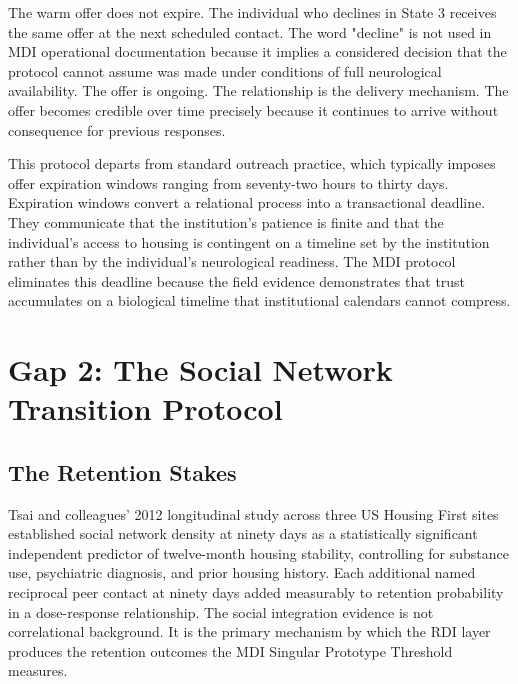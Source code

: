 \documentclass[12pt, letterpaper]{article}
\begin{document}
The warm offer does not expire. The individual who declines in State 3 receives the same offer at the next scheduled contact. The word "decline" is not used in MDI operational documentation because it implies a considered decision that the protocol cannot assume was made under conditions of full neurological availability. The offer is ongoing. The relationship is the delivery mechanism. The offer becomes credible over time precisely because it continues to arrive without consequence for previous responses.

This protocol departs from standard outreach practice, which typically imposes offer expiration windows ranging from seventy-two hours to thirty days. Expiration windows convert a relational process into a transactional deadline. They communicate that the institution's patience is finite and that the individual's access to housing is contingent on a timeline set by the institution rather than by the individual's neurological readiness. The MDI protocol eliminates this deadline because the field evidence demonstrates that trust accumulates on a biological timeline that institutional calendars cannot compress.


\clearpage
\section{Gap 2: The Social Network Transition Protocol}

\subsection{The Retention Stakes}

Tsai and colleagues' 2012 longitudinal study across three US Housing First sites established social network density at ninety days as a statistically significant independent predictor of twelve-month housing stability, controlling for substance use, psychiatric diagnosis, and prior housing history. Each additional named reciprocal peer contact at ninety days added measurably to retention probability in a dose-response relationship. The social integration evidence is not correlational background. It is the primary mechanism by which the RDI layer produces the retention outcomes the MDI Singular Prototype Threshold measures.
\end{document}
